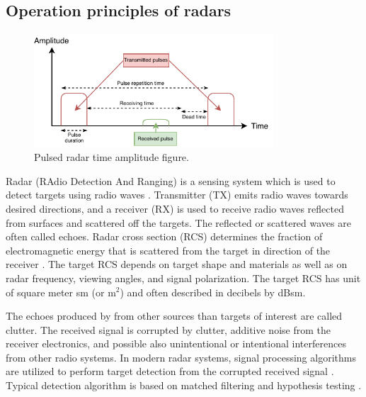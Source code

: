 \documentclass[english, 12pt, a4paper, elec, utf8, a-1b, online]{aaltothesis}
\begin{document}
\subsection{Operation principles of radars} \label{sec:radar_opertaion_principle}

\begin{figure}[htb]
    \centering
    \includegraphics[width=0.8\textwidth]{figures/background/pulsed_radar.pdf}
    \caption{Pulsed radar time amplitude figure.}
    \label{fig:pulsed_radar}
\end{figure}

Radar (RAdio Detection And Ranging) is a sensing system which is used to detect targets using radio waves \cite{Curry2011}.
Transmitter (TX) emits radio waves towards desired directions, and a receiver (RX) is used to receive radio waves reflected from surfaces and scattered off the targets. 
The reflected or scattered waves are often called echoes.
Radar cross section (RCS) determines the fraction of electromagnetic energy that is scattered from the target in direction of the receiver \cite{Curry2011}.
The target RCS depends on target shape and materials as well as on radar frequency, viewing angles, and signal polarization.
The target RCS has unit of square meter sm (or m$^2$) and often described in decibels by dBsm.

The echoes produced by from other sources than targets of interest are called clutter.
The received signal is corrupted by clutter, additive noise from the receiver electronics, and possible also unintentional or intentional interferences from other radio systems.
In modern radar systems, signal processing algorithms are utilized to perform target detection from the corrupted received signal \cite{Mahafza2015}.
Typical detection algorithm is based on matched filtering and hypothesis testing \cite{Mahafza2015}.
\end{document}
